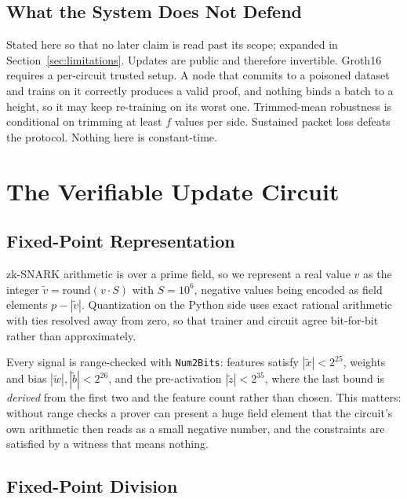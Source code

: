 \documentclass{llncs}
\begin{document}
\subsection{What the System Does Not Defend}

Stated here so that no later claim is read past its scope; expanded in
Section~\ref{sec:limitations}. Updates are public and therefore invertible.
Groth16 requires a per-circuit trusted setup. A node that commits to a poisoned
dataset and trains on it correctly produces a valid proof, and nothing binds a
batch to a height, so it may keep re-training on its worst one. Trimmed-mean
robustness is conditional on trimming at least $f$ values per side. Sustained
packet loss defeats the protocol. Nothing here is constant-time.

\section{The Verifiable Update Circuit}
\label{sec:circuit}

\subsection{Fixed-Point Representation}

zk-SNARK arithmetic is over a prime field, so we represent a real value $v$ as
the integer $\tilde v = \mathrm{round}(v \cdot S)$ with $S = 10^6$, negative
values being encoded as field elements $p - |\tilde v|$. Quantization on the
Python side uses exact rational arithmetic with ties resolved away from zero, so
that trainer and circuit agree bit-for-bit rather than approximately.

Every signal is range-checked with \texttt{Num2Bits}: features satisfy
$|\tilde x| < 2^{25}$, weights and bias $|\tilde w|, |\tilde b| < 2^{26}$, and
the pre-activation $|\tilde z| < 2^{35}$, where the last bound is
\emph{derived} from the first two and the feature count rather than chosen. This
matters: without range checks a prover can present a huge field element that the
circuit's own arithmetic then reads as a small negative number, and the
constraints are satisfied by a witness that means nothing.

\subsection{Fixed-Point Division}
\label{sec:div}
\end{document}
